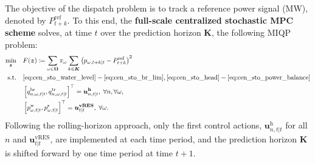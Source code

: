 \documentclass[10pt,a4paper]{amsart}
\begin{document}
The objective of the dispatch problem is to track a reference power signal (MW), denoted by $P^{\mathrm{ref}}_{t+k}$.
To this end, the \textbf{full-scale centralized stochastic MPC scheme} solves, at time $t$ over the prediction horizon $\boldsymbol{K}$, the following MIQP problem:
\begin{subequations}
\label{eq:cen_sto_MPC}
\begin{align}
\min_{\boldsymbol{z}} \quad & F(\boldsymbol{z}) \coloneqq \sum_{\omega \in \boldsymbol{\Omega}} \pi_{\omega} \sum_{k \in \boldsymbol{K}} \left( p_{\omega, t+k|t} - P^{\mathrm{ref}}_{t+k} \right)^2 \label{eq:cen_sto_obj}\\
\text{s.t.} \quad & \eqref{eq:cen_sto_water_level}-\eqref{eq:cen_sto_br_lim}, \eqref{eq:cen_sto_head}-\eqref{eq:cen_sto_power_balance}\\
& \left[
q^{\mathrm{br}}_{n,\omega,t|t},
q^{\mathrm{tr}}_{n,\omega,t|t}
\right]^\top = \boldsymbol{u}^{\boldsymbol{\mathrm{h}}}_{n, t|t}, \; \forall n, \forall \omega, \label{eq:cen_sto_MPC_control_hydro}\\
& \left[
p^{\mathrm{w}}_{\omega, t|t},
p^{\mathrm{s}}_{\omega, t|t}
\right]^\top = \boldsymbol{u}^{\boldsymbol{\mathrm{vRES}}}_{t|t}, \; \forall \omega. \label{eq:cen_sto_MPC_control_vres}
\end{align}
\end{subequations}
Following the rolling-horizon approach, only the first control actions,
$\boldsymbol{u}^{\boldsymbol{\mathrm{h}}}_{n,t|t}$ for all $n$ and $\boldsymbol{u}^{\boldsymbol{\mathrm{vRES}}}_{t|t}$,
are implemented at each time period, and the prediction horizon $\boldsymbol{K}$ is shifted forward by one time period at time $t+1$.
\end{document}
